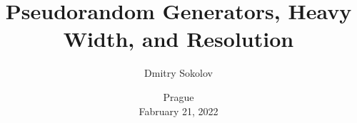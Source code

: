 

\titlegraphic{
    
}


\title[]{
    Pseudorandom Generators, Heavy Width, and Resolution
}

\author{
    Dmitry Sokolov
}  


\date{Prague\\ Fabruary 21, 2022}

\newcommand{\SPCR}{\PrSys{S}\text{-}\PrSys{PCR}}
\newcommand{\SSOS}{\PrSys{S}\text{-}\PrSys{SOS}}




    \maketitle

    
    
    
    

